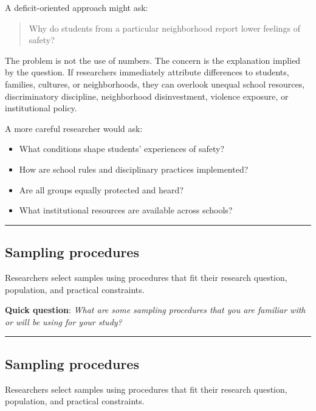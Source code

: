 \documentclass[
  letterpaper,
  DIV=11,
  numbers=noendperiod]{scrartcl}
\providecommand{\tightlist}{%
  \setlength{\itemsep}{0pt}\setlength{\parskip}{0pt}}\usepackage{longtable,booktabs,array}
\begin{document}
A deficit-oriented approach might ask:

\begin{quote}
Why do students from a particular neighborhood report lower feelings of
safety?
\end{quote}

The problem is not the use of numbers. The concern is the explanation
implied by the question. If researchers immediately attribute
differences to students, families, cultures, or neighborhoods, they can
overlook unequal school resources, discriminatory discipline,
neighborhood disinvestment, violence exposure, or institutional policy.

A more careful researcher would ask:

\begin{itemize}
\tightlist
\item
  What conditions shape students' experiences of safety?
\item
  How are school rules and disciplinary practices implemented?
\item
  Are all groups equally protected and heard?
\item
  What institutional resources are available across schools?
\end{itemize}

\begin{center}\rule{0.5\linewidth}{0.5pt}\end{center}

\subsection{Sampling procedures}\label{sampling-procedures}

Researchers select samples using procedures that fit their research
question, population, and practical constraints.

\textbf{Quick question}: \emph{What are some sampling procedures that
you are familiar with or will be using for your study?}

\begin{center}\rule{0.5\linewidth}{0.5pt}\end{center}

\subsection{Sampling procedures}\label{sampling-procedures-1}

Researchers select samples using procedures that fit their research
question, population, and practical constraints.
\end{document}
